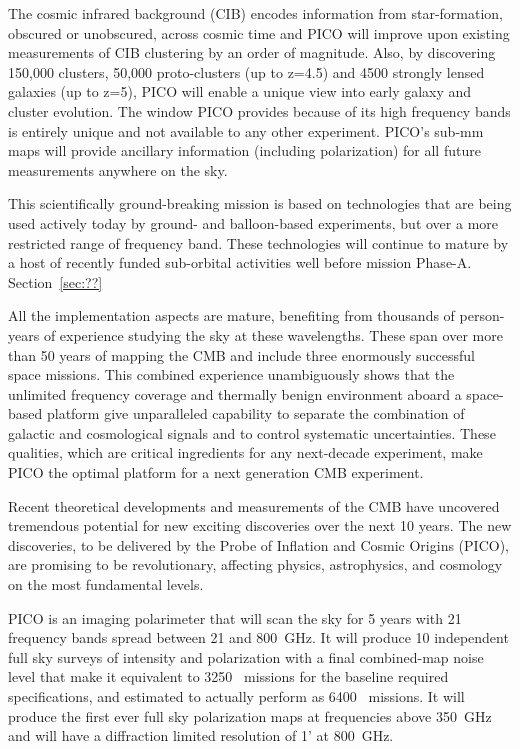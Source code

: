 \documentclass[PICOReport.tex]{subfiles}
\begin{document}
The cosmic infrared background (CIB) encodes information from star-formation, obscured or unobscured, across cosmic time and PICO will improve upon existing measurements of CIB clustering by an order of magnitude.  Also, by discovering 150,000 clusters, 50,000 proto-clusters (up to z=4.5) and 4500 strongly lensed galaxies (up to z=5), PICO will enable a unique view into early galaxy and cluster evolution. The window PICO provides because of its high frequency bands is entirely unique and not available to any other experiment.  PICO's sub-mm maps will provide ancillary information (including polarization) for all future measurements anywhere on the sky.  

This scientifically ground-breaking mission is based on technologies that are being used actively today by ground- and balloon-based experiments, but over a more restricted range of frequency band. These technologies will continue to mature by a host of recently funded sub-orbital activities well before mission Phase-A. Section~\ref{sec:??}

All the implementation aspects are mature, benefiting from thousands of person-years of experience studying the sky at these wavelengths. These span over more than 50 years of mapping the CMB and include three enormously successful space missions. This combined experience unambiguously shows that the unlimited frequency coverage and thermally benign environment aboard a space-based platform give unparalleled capability to separate the combination of galactic and cosmological signals and to control systematic uncertainties. These qualities, which are critical ingredients for any next-decade experiment, make PICO the optimal platform for a next generation CMB experiment.


Recent theoretical developments and measurements of the \ac{CMB} have uncovered tremendous potential for new exciting discoveries over the next 10 years. The new discoveries, to be delivered by the Probe of Inflation and Cosmic Origins (PICO), are promising to be revolutionary, affecting physics, astrophysics, and cosmology on the most fundamental levels. 

PICO is an imaging polarimeter that will scan the sky for 5 years with 21 frequency bands spread between 21 and 800~GHz. It will produce 10 independent full sky surveys of intensity and polarization with a final combined-map noise level that make it equivalent to 3250 \planck\ missions for the baseline required specifications, and estimated to actually perform as 6400 \planck\ missions. It will produce the first ever full sky polarization maps at frequencies above 350~GHz and will have a diffraction limited resolution of 1' at 800~GHz. 
\end{document}
